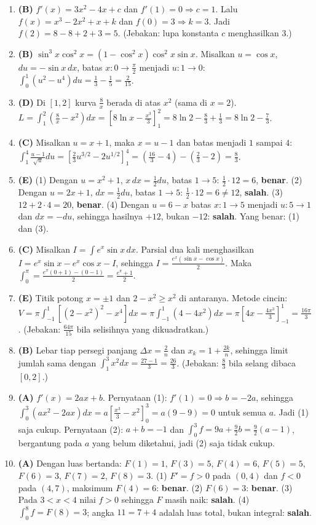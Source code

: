 \documentclass[a4paper,11pt]{article}
\begin{document}
\begin{enumerate}[leftmargin=2em,itemsep=2pt,topsep=2pt]
\item[\textbf{11.}] \textbf{(B)} $f'(x)=3x^2-4x+c$ dan $f'(1)=0\Rightarrow c=1$. Lalu $f(x)=x^3-2x^2+x+k$ dan $f(0)=3\Rightarrow k=3$. Jadi $f(2)=8-8+2+3=5$. (Jebakan: lupa konstanta $c$ menghasilkan $3$.)
\item[\textbf{12.}] \textbf{(B)} $\sin^3x\cos^2x=(1-\cos^2x)\cos^2x\sin x$. Misalkan $u=\cos x$, $du=-\sin x\,dx$, batas $x:0\to\frac\pi2$ menjadi $u:1\to0$: $\int_0^1(u^2-u^4)du=\frac13-\frac15=\frac2{15}$.
\item[\textbf{13.}] \textbf{(D)} Di $[1,2]$ kurva $\frac8x$ berada di atas $x^2$ (sama di $x=2$). $L=\int_1^2\left(\frac8x-x^2\right)dx=\left[8\ln x-\frac{x^3}{3}\right]_1^2=8\ln2-\frac83+\frac13=8\ln2-\frac73$.
\item[\textbf{14.}] \textbf{(C)} Misalkan $u=x+1$, maka $x=u-1$ dan batas menjadi $1$ sampai $4$: $\int_1^4\frac{u-1}{\sqrt u}du=\left[\frac23u^{3/2}-2u^{1/2}\right]_1^4=\left(\frac{16}{3}-4\right)-\left(\frac23-2\right)=\frac83$.
\item[\textbf{15.}] \textbf{(E)} (1) Dengan $u=x^2+1$, $x\,dx=\frac12du$, batas $1\to5$: $\frac12\cdot12=6$, \textbf{benar}. (2) Dengan $u=2x+1$, $dx=\frac12du$, batas $1\to5$: $\frac12\cdot12=6\neq12$, \textbf{salah}. (3) $12+2\cdot4=20$, \textbf{benar}. (4) Dengan $u=6-x$ batas $x:1\to5$ menjadi $u:5\to1$ dan $dx=-du$, sehingga hasilnya $+12$, bukan $-12$: \textbf{salah}. Yang benar: (1) dan (3).
\item[\textbf{16.}] \textbf{(C)} Misalkan $I=\int e^x\sin x\,dx$. Parsial dua kali menghasilkan $I=e^x\sin x-e^x\cos x-I$, sehingga $I=\frac{e^x(\sin x-\cos x)}{2}$. Maka $\int_0^\pi=\frac{e^\pi(0+1)-(0-1)}{2}=\frac{e^\pi+1}{2}$.
\item[\textbf{17.}] \textbf{(E)} Titik potong $x=\pm1$ dan $2-x^2\ge x^2$ di antaranya. Metode cincin: $V=\pi\int_{-1}^1\left[(2-x^2)^2-x^4\right]dx=\pi\int_{-1}^1(4-4x^2)dx=\pi\left[4x-\frac{4x^3}{3}\right]_{-1}^1=\frac{16\pi}{3}$. (Jebakan: $\frac{64\pi}{15}$ bila selisihnya yang dikuadratkan.)
\item[\textbf{18.}] \textbf{(B)} Lebar tiap persegi panjang $\Delta x=\frac2n$ dan $x_k=1+\frac{2k}{n}$, sehingga limit jumlah sama dengan $\int_1^3x^2dx=\frac{27-1}{3}=\frac{26}{3}$. (Jebakan: $\frac83$ bila selang dibaca $[0,2]$.)
\item[\textbf{19.}] \textbf{(A)} $f'(x)=2ax+b$. Pernyataan (1): $f'(1)=0\Rightarrow b=-2a$, sehingga $\int_0^3(ax^2-2ax)dx=a\left[\frac{x^3}{3}-x^2\right]_0^3=a(9-9)=0$ untuk semua $a$. Jadi (1) saja cukup. Pernyataan (2): $a+b=-1$ dan $\int_0^3f=9a+\frac92b=\frac92(a-1)$, bergantung pada $a$ yang belum diketahui, jadi (2) saja tidak cukup.
\item[\textbf{20.}] \textbf{(A)} Dengan luas bertanda: $F(1)=1$, $F(3)=5$, $F(4)=6$, $F(5)=5$, $F(6)=3$, $F(7)=2$, $F(8)=3$. (1) $F'=f>0$ pada $(0,4)$ dan $f<0$ pada $(4,7)$, maksimum $F(4)=6$: \textbf{benar}. (2) $F(6)=3$: \textbf{benar}. (3) Pada $3<x<4$ nilai $f>0$ sehingga $F$ masih naik: \textbf{salah}. (4) $\int_0^8f=F(8)=3$; angka $11=7+4$ adalah luas total, bukan integral: \textbf{salah}.
\end{enumerate}
\end{document}
